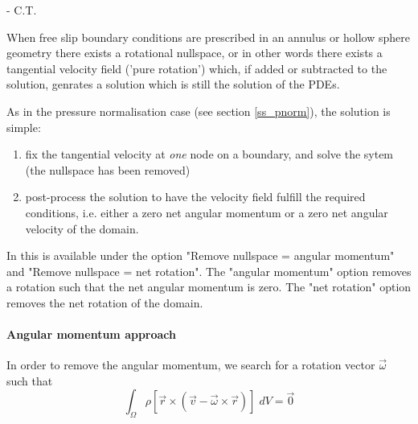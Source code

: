 {\tiny \date{\today} - C.T.}
  

When free slip boundary conditions are prescribed in an annulus or
hollow sphere geometry there exists a rotational nullspace, or in other words there exists
a tangential velocity field ('pure rotation') which, 
if added or subtracted to the solution, genrates a solution which is still the solution of the PDEs. 

As in the pressure normalisation case (see section \ref{ss_pnorm}), the solution is simple:
\begin{enumerate}
\item fix the tangential velocity at {\it one} node on a boundary, and solve the sytem (the nullspace 
has been removed)
\item post-process the solution to have the velocity field fulfill the required conditions, i.e.
either a zero net angular momentum or a zero net angular velocity of the domain. 
\end{enumerate}

\begin{remark}
In \aspect{} this is available under the option 
"Remove nullspace = angular momentum" and "Remove nullspace = net rotation".
The "angular momentum" option removes a rotation such that the net angular momentum is zero.
The "net rotation" option removes the net rotation of the domain.
\end{remark}

\paragraph{Angular momentum approach}

In order to remove the angular momentum, we search for a rotation
vector ${\vec \omega}$ such that
\begin{equation}
\int_\Omega \rho[{\vec r} \times ({\vec v}-{\vec \omega} \times {\vec r})] \; dV= \vec 0
\end{equation}

